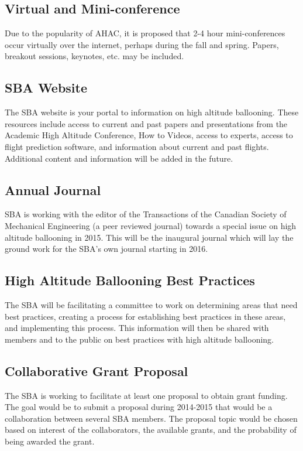 \documentclass[10pt,foldmark,notumble]{leaflet}
\begin{document}

\subsection{Virtual and Mini-conference}  
Due to the popularity of AHAC, it is proposed that 2-4 hour mini-conferences occur virtually over the internet, perhaps during the fall and spring. Papers, breakout sessions, keynotes, etc. may be included.

\subsection{SBA Website}
The SBA website is your portal to information on high altitude ballooning.  These resources include access to current and past papers and presentations from the Academic High Altitude Conference, How to Videos, access to experts, access to flight prediction software, and information about current and past flights.  Additional content and information will be added in the future.

\subsection{Annual Journal}
SBA is working with the editor of the Transactions of the Canadian Society of Mechanical Engineering (a peer reviewed journal) towards a special issue on high altitude ballooning in 2015.  This will be the inaugural journal which will lay the ground work for the SBA's own journal starting in 2016. 
\ \\
\subsection{High Altitude Ballooning Best Practices}
The SBA will be facilitating a committee to work on determining areas that need best practices, creating a process for establishing best practices in these areas, and implementing this process.  This information will then be shared with members and to the public on best practices with high altitude ballooning.
\ \\
\subsection{Collaborative Grant Proposal}
The SBA is working to facilitate at least one proposal to obtain grant funding. The goal would be to submit a proposal during 2014-2015 that would be a collaboration between several SBA members. The proposal topic would be chosen based on interest of the collaborators, the available grants, and the probability of being awarded the grant.
\ \\
\end{document}

